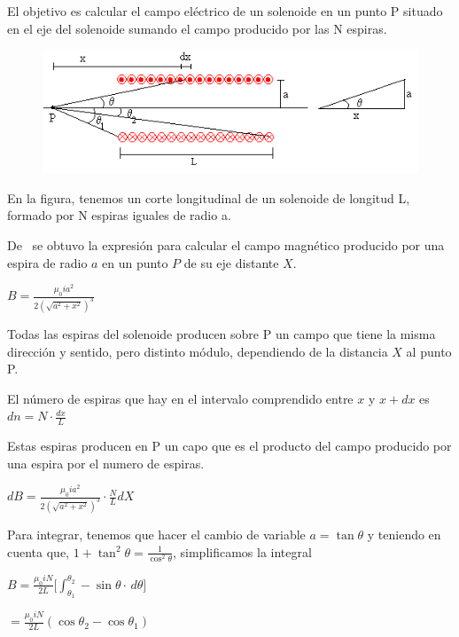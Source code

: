 \documentclass[letterpaper, 12pt]{article}
\begin{document}
\begin{multicols}{2}
	El objetivo es calcular el campo eléctrico de un solenoide en un punto P situado
	en el eje del solenoide sumando el campo producido por las N espiras.

	\begin{figure}[H]
		\includegraphics[width = \linewidth]{./Images/solenoide.png}
	\end{figure}

	En la figura, tenemos un corte longitudinal de un solenoide de longitud L,
	formado por N espiras iguales de radio a.

	De~\cite{CampoElectricoPorEspira} se obtuvo la expresión para calcular el campo
	magnético producido por una espira de radio $a$ en un punto $P$ de su eje
	distante $X$.

		{\large $B = \displaystyle\frac{\mu_0 i a^2}{2 \left(\sqrt{a^2 + x^2}\right)^3}$}

	Todas las espiras del solenoide producen sobre P un campo que tiene la misma
	dirección y sentido, pero distinto módulo, dependiendo de la distancia $X$ al
	punto P.

	El número de espiras que hay en el intervalo comprendido entre
	$x$ y $x+dx$ es $dn = N \cdot \frac{dx}{L}$

	Estas espiras producen en P un capo que es el producto del campo producido por
	una espira por el numero de espiras.

		{\large $dB = \frac{\mu_0 i a^2}{2 \left(\sqrt{a^2 + x^2}\right)^3} \cdot \frac{N}{L} dX$}

	Para integrar, tenemos que hacer el cambio de variable $a = \tan\theta$ y
	teniendo en cuenta que, {\large $1 + \tan^{2}\theta = \frac{1}{\cos^{2}\theta}$},
	simplificamos la integral


		{\large $B = \frac{\mu_0 i N}{2L} \Bigg[ \displaystyle\int_{\theta_1}^{\theta_2} -\sin\theta \cdot \,d\theta \Bigg]$}

		{\large $ = \frac{\mu_0 i N}{2L} \left(\cos\theta_2 - \cos\theta_1\right)$}


\end{multicols}
\end{document}
